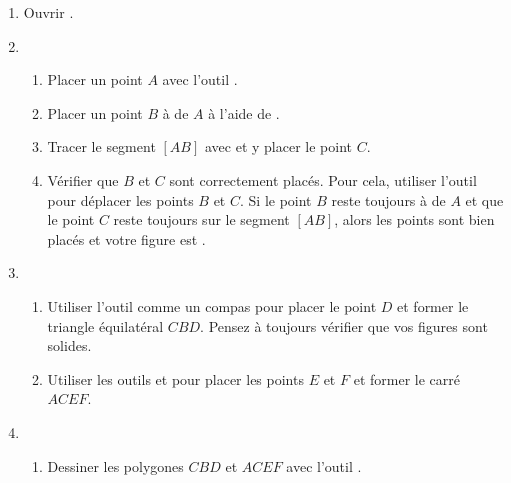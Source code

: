



\begin{enumerate}
    \item Ouvrir .
    \item \begin{enumerate}
        \item Placer un point $A$ avec l'outil \gdot.
        \item Placer un point $B$ à  de $A$ à l'aide de \gcircleRadius.
        \item Tracer le segment $[AB]$ avec \gsegment{} et y placer le point $C$.
        \item Vérifier que $B$ et $C$ sont correctement placés.
        Pour cela, utiliser l'outil \gselect{} pour déplacer les points $B$ et $C$.
        Si le point $B$ reste toujours à  de $A$ et que le point $C$ reste toujours sur le segment $[AB]$, alors les points sont bien placés et votre figure est .
    \end{enumerate}
    \item \begin{enumerate}
        \item Utiliser l'outil \gcirclePoint{} comme un compas pour placer le point $D$ et former le triangle équilatéral $CBD$.
        Pensez à toujours vérifier que vos figures sont solides.
        \item Utiliser les outils \gcirclePoint{} et \gperpendicular{} pour placer les points $E$ et $F$ et former le carré $ACEF$.
    \end{enumerate}
    \item \begin{enumerate}
        \item Dessiner les polygones $CBD$ et $ACEF$ avec l'outil \gpolygon{}.

\end{enumerate}
\end{enumerate}
